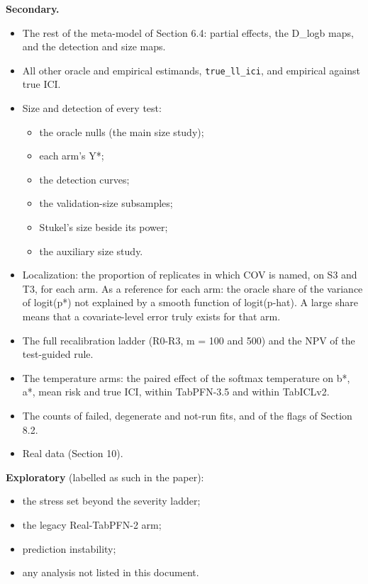 \documentclass[
  10pt,
]{article}
\providecommand{\tightlist}{%
  \setlength{\itemsep}{0pt}\setlength{\parskip}{0pt}}
\begin{document}
\textbf{Secondary.}

\begin{itemize}
\tightlist
\item
  The rest of the meta-model of Section 6.4: partial
  effects, the D\_logb maps, and the detection and size
  maps.
\item
  All other oracle and empirical estimands,
  \texttt{true\_ll\_ici}, and empirical against true ICI.
\item
  Size and detection of every test:

  \begin{itemize}
  \tightlist
  \item
    the oracle nulls (the main size study);
  \item
    each arm's Y*;
  \item
    the detection curves;
  \item
    the validation-size subsamples;
  \item
    Stukel's size beside its power;
  \item
    the auxiliary size study.
  \end{itemize}
\item
  Localization: the proportion of replicates in which COV is
  named, on S3 and T3, for each arm. As a reference for each
  arm: the oracle share of the variance of logit(p*) not
  explained by a smooth function of logit(p-hat). A large
  share means that a covariate-level error truly exists for
  that arm.
\item
  The full recalibration ladder (R0-R3, m = 100 and 500) and
  the NPV of the test-guided rule.
\item
  The temperature arms: the paired effect of the softmax
  temperature on b*, a*, mean risk and true ICI, within
  TabPFN-3.5 and within TabICLv2.
\item
  The counts of failed, degenerate and not-run fits, and of
  the flags of Section 8.2.
\item
  Real data (Section 10).
\end{itemize}

\textbf{Exploratory} (labelled as such in the paper):

\begin{itemize}
\tightlist
\item
  the stress set beyond the severity ladder;
\item
  the legacy Real-TabPFN-2 arm;
\item
  prediction instability;
\item
  any analysis not listed in this document.
\end{itemize}
\end{document}
